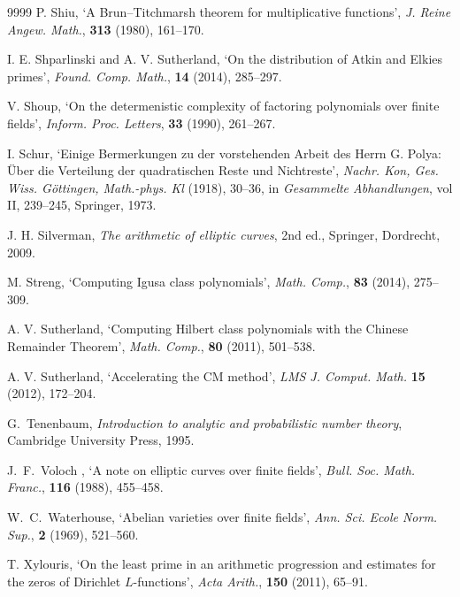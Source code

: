 \documentclass[12pt]{amsart}
\begin{document}
\begin{thebibliography}{9999}
P. Shiu, `A Brun--Titchmarsh theorem for multiplicative functions',
{\it J. Reine Angew. Math.\/}, {\bf 313} (1980), 161--170.

  I. E. Shparlinski and A. V. Sutherland, 
`On the distribution of Atkin and Elkies primes',
{\it Found. Comp. Math.\/}, {\bf 14} (2014), 285--297.


 V. Shoup, `On the determenistic complexity of factoring
polynomials over finite fields', {\it Inform. Proc. Letters\/},
{\bf 33} (1990), 261--267.

 I. Schur, `Einige Bermerkungen zu der vorstehenden Arbeit des Herrn G. Polya: \"Uber die Verteilung der quadratischen Reste und Nichtreste', {\it Nachr. Kon, Ges. Wiss. G\"
ottingen, Math.-phys. Kl} (1918), 30--36, in {\it Gesammelte Abhandlungen}, vol II, 239--245, Springer, 1973.

 J. H. Silverman, {\it The arithmetic of elliptic
curves\/}, 2nd ed.,
Springer, Dordrecht, 2009.

 M. Streng, `Computing Igusa class polynomials', {\it Math. Comp.\/}, {\bf 83} (2014), 275--309.

 A. V. Sutherland, `Computing Hilbert class polynomials with the {C}hinese {R}emainder {T}heorem',
{\it Math. Comp.\/}, {\bf 80} (2011), 501--538.

 A. V. Sutherland, `Accelerating the CM method', {\it LMS J. Comput. Math\/.} {\bf 15} (2012), 172--204.

 G.~Tenenbaum, {\it Introduction to analytic and probabilistic number theory\/}, Cambridge University Press, 1995.

 J.~F.~Voloch ,
`A note on elliptic curves over finite fields',
{\it Bull.  Soc.  Math.  Franc.\/}, {\bf 116} (1988), 455--458.


 W.~C.~Waterhouse, `Abelian varieties over finite fields',
{\it Ann.  Sci.  Ecole Norm.  Sup.\/}, {\bf 2} (1969), 521--560.

T. Xylouris, `On the least prime in an arithmetic progression and estimates for the zeros of Dirichlet $L$-functions',
{\it Acta Arith.\/}, {\bf 150} (2011), 65--91.

\end{thebibliography}
\end{document}
